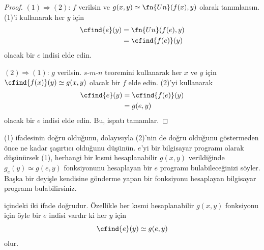 \documentclass[../../../include/open-logic-section]{subfiles}
\begin{document}
\begin{proof}
$(1)\Rightarrow(2)$: $f$ verilsin ve
$g(x,y)\simeq\fn{Un}(f(x),y)$ olarak tanımlansın. (1)'i kullanarak her $y$
için
\begin{align*}
  \cfind{e}(y) & = \fn{Un}(f(e),y)\\
  & = \cfind{f(e)}(y)
\end{align*}
olacak bir $e$ indisi elde edin.

$(2)\Rightarrow(1)$: $g$ verilsin. $s$-$m$-$n$ teoremini kullanarak her
$x$ ve $y$ için $\cfind{f(x)}(y)\simeq g(x,y)$ olacak bir $f$ elde edin.
(2)'yi kullanarak
\begin{align*}
  \cfind{e}(y) & = \cfind{f(e)}(y)\\
  & = g(e,y)
\end{align*}
olacak bir $e$ indisi elde edin. Bu, ispatı tamamlar.
\end{proof}

\begin{explain}
(1) ifadesinin doğru olduğunu, dolayısıyla (2)'nin de doğru olduğunu
göstermeden önce ne kadar şaşırtıcı olduğunu düşünün. $e$'yi bir bilgisayar
programı olarak düşünürsek (1), herhangi bir kısmi hesaplanabilir $g(x,y)$
verildiğinde $g_e(y)\simeq g(e,y)$ fonksiyonunu hesaplayan bir $e$ programı
bulabileceğinizi söyler. Başka bir deyişle kendisine gönderme yapan bir
fonksiyonu hesaplayan bilgisayar programı bulabilirsiniz.
\end{explain}

\begin{thm}
 içindeki iki ifade doğrudur. Özellikle her kısmi
hesaplanabilir $g(x,y)$ fonksiyonu için öyle bir $e$ indisi vardır ki her
$y$ için
\[
  \cfind{e}(y)\simeq g(e,y)
\]
olur.
\end{thm}
\end{document}
